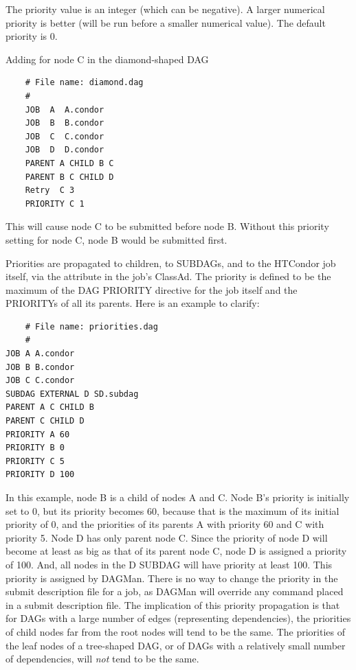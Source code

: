 The priority value is an integer (which can be negative).  A larger
numerical priority is better (will be run before a smaller numerical
value).  The default priority is 0.

Adding  for node C in the diamond-shaped
DAG
\footnotesize
\begin{verbatim}
    # File name: diamond.dag
    #
    JOB  A  A.condor 
    JOB  B  B.condor 
    JOB  C  C.condor	
    JOB  D  D.condor
    PARENT A CHILD B C
    PARENT B C CHILD D
    Retry  C 3
    PRIORITY C 1
\end{verbatim}
\normalsize

This will cause node C to be submitted before node B.
Without this priority setting for node C, node B would be submitted first.

Priorities are propagated to children, to SUBDAGs, 
and to the HTCondor job itself,
via the  attribute in the job's ClassAd. 
The priority is defined to be the maximum of the DAG PRIORITY directive 
for the job itself and the PRIORITYs of all its parents. 
Here is an example to clarify:

\footnotesize
\begin{verbatim}
    # File name: priorities.dag
    #
JOB A A.condor
JOB B B.condor
JOB C C.condor
SUBDAG EXTERNAL D SD.subdag
PARENT A C CHILD B
PARENT C CHILD D
PRIORITY A 60
PRIORITY B 0
PRIORITY C 5
PRIORITY D 100
\end{verbatim}
\normalsize

In this example, node B is a child of nodes A and C. 
Node B's priority is initially set to 0,
but its priority becomes 60,
because that is the maximum of its initial priority of 0,
and the priorities of its parents
A with priority 60 and C with priority 5.
Node D has only parent node C.
Since the priority of node D will become at least as big as that of 
its parent node C,
node D is assigned a priority of 100.
And, all nodes in the D SUBDAG will have priority at least 100.
This priority is assigned by DAGMan.
There is no way to change the priority in the submit description file for a job,
as DAGMan will override any  command placed
in a submit description file.
The implication of this priority propagation is
that for DAGs with a large number of edges (representing dependencies), 
the priorities of child nodes far from the root nodes 
will tend to be the same.
The priorities of the leaf nodes of a tree-shaped DAG,
or of DAGs with a relatively small number of dependencies,
will \emph{not} tend to be the same.

